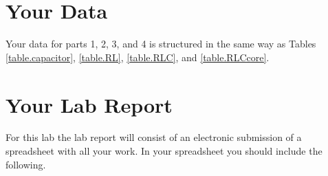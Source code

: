 \section{Your Data}
Your data for parts 1, 2, 3, and 4 is structured in the same way as Tables \ref{table.capacitor}, \ref{table.RL}, \ref{table.RLC}, and \ref{table.RLCcore}.
\section{Your Lab Report}
For this lab the lab report will consist of an electronic submission of a spreadsheet with all your work. In your spreadsheet you should include the following.

